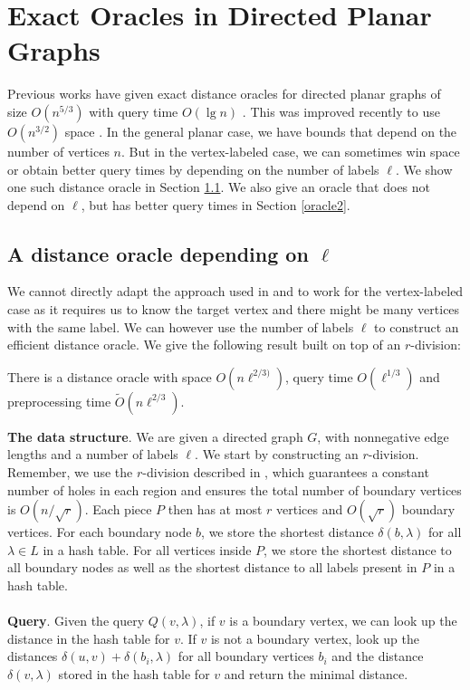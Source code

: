 \section{Exact Oracles in Directed Planar Graphs}\label{exactPlanar}
Previous works have given exact distance oracles for directed planar graphs of size
$O(n^{5/3})$ with query time $O(\lg n)$ \cite{cohen2017fast}. This was improved recently
to use $O(n^{3/2})$ space \cite{gawrychowski2017better}. In the general planar case, we have
bounds that depend on the number of vertices $n$. But in the vertex-labeled case, we can
sometimes win space or obtain better query times by depending on the number of labels
$\ell$. We show one such distance oracle in Section \ref{oracle1}. We also give an oracle
that does not depend on $\ell$, but has better query times in Section \ref{oracle2}.

\subsection{A distance oracle depending on $\ell$}\label{oracle1}
We cannot directly adapt the approach used in \cite{cohen2017fast} and \cite{gawrychowski2017better} to work
for the vertex-labeled case as it requires us to know the target vertex and there might
be many vertices with the same label. We can however use the number of labels $\ell$ to
construct an efficient distance oracle. We give the following result built on top of an
$r$-division:
\begin{thm}\label{thm1}
  There is a distance oracle with space $O(n\ell^{2/3)})$, query time $O(\ell^{1/3})$ and
  preprocessing time $\tilde{O}(n\ell^{2/3})$.
\end{thm}
\textbf{The data structure}.
We are given a directed graph $G$, with nonnegative edge lengths and a number of labels
$\ell$. We start by constructing an $r$-division. Remember, we use the $r$-division described in
\cite{klein2013structured}, which guarantees a constant number of holes in each region
and ensures the total number of boundary vertices is $O(n/\sqrt{r})$. Each piece $P$ then
has at most $r$ vertices and $O(\sqrt{r})$
boundary vertices. For each boundary node $b$, we store the shortest distance $\delta(b,\lambda)$
for all $\lambda \in L$ in a hash table. For all vertices inside $P$, we store the shortest
distance to all boundary nodes as well as the shortest distance to all labels present in
$P$ in a hash table. \\
\\
\indent \textbf{Query}.
Given the query $Q(v, \lambda)$, if $v$ is a boundary vertex, we can look
up the distance in the hash table for $v$. If $v$ is not a boundary vertex, look up the
distances $\delta(u,v)+\delta(b_i,\lambda)$ for all boundary vertices $b_i$ and the distance
$\delta(v,\lambda)$ stored in the hash table for $v$ and return the minimal distance.

